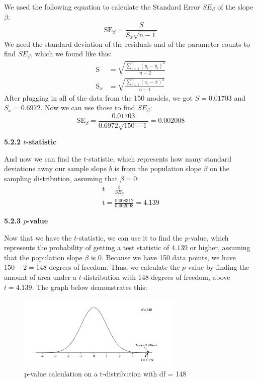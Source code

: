 \documentclass[12pt]{article}
\begin{document}
    \noindent We used the following equation to calculate the Standard Error $SE_\beta$ of the slope $\beta$:
    \[
        \mathrm{SE}_{\beta}
        =
        \frac{
            \displaystyle S
        }{
            \displaystyle S_x \sqrt{n - 1}
        }
    \]
    \noindent We need the standard deviation of the residuals and of the parameter counts to find $SE_\beta$, which we found like this:
    \begin{align*}
        \mathrm{S} &=
        \sqrt{
            \frac{
                \sum_{i=1}^n (y_i - \hat{y}_i)^2
            }{
                n - 2
            }
        } \\[1em]
        \mathrm{S}_x &=
        \sqrt{
            \frac{
                \sum_{i=1}^n (x_i - \bar{x})^2
            }{
                n - 1
            }
        }
    \end{align*}
    \noindent After plugging in all of the data from the 150 models, we got $S = 0.01703$ and $S_x = 0.6972$.
    Now we can use those to find $SE_\beta$:
    \[
        \mathrm{SE}_{\beta}
        =
        \frac{
            \displaystyle 0.01703
        }{
            \displaystyle 0.6972 \sqrt{150 - 1}
        }
        =
        0.002008
    \]

    \noindent\textbf{5.2.2 $t$-statistic}

    \noindent And now we can find the $t$-statistic, which represents how many standard deviations away our sample slope $b$ is from the population slope $\beta$ on the sampling distribution, assuming that $\beta=0$:
    \begin{gather*}
        \mathrm{t} = \frac{b}{SE_\beta} \\[1em]
        \mathrm{t} = \frac{0.008312}{0.002008} = 4.139
    \end{gather*}

    \noindent\textbf{5.2.3 $p$-value}

    \noindent Now that we have the $t$-statistic, we can use it to find the $p$-value, which represents the probability of getting a test statistic
    of $4.139$ or higher, assuming that the population slope $\beta$ is $0$. Because we have 150 data points, we have $150 - 2 = 148$ degrees of freedom.
    Thus, we calculate the $p$-value by finding the amount of area under a $t$-distribution with 148 degrees of freedom, above $t=4.139$. The graph below demonstrates this:

    \begin{figure}[H]
        \centering
        \includegraphics[width=0.7\textwidth]{Images/tdistribution}
        \caption{p-value calculation on a t-distribution with df = 148}
        \label{fig:t_dist}
    \end{figure}
\end{document}
